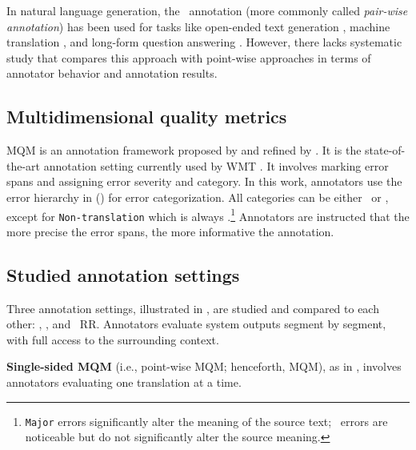 In natural language generation, the \sxs~annotation (more commonly called \textit{pair-wise annotation}) has been used for tasks like open-ended text generation \citep{wang-etal-2023-knn, krishna-etal-2023-longeval}, machine translation \citep{karpinska-iyyer-2023-large}, and long-form question answering \citep{xu-etal-2023-critical}. However, there lacks systematic study that compares this approach with point-wise approaches in terms of annotator behavior and annotation results.

\subsection{Multidimensional quality metrics}\label{sec:MQM}

MQM is an annotation framework proposed by \citet{lommel2014mqm} and refined by \citet{freitag-etal-2021-experts}. It is the state-of-the-art annotation setting currently used by WMT \citep{freitag-etal-2023-results}. It involves marking error spans and assigning error severity and category. In this work, annotators use the error hierarchy in  () for error categorization. All categories can be either \major~or \minor, except for \texttt{Non-translation} which is always \major.\footnote{\texttt{Major} errors significantly alter the meaning of the source text; \minor~errors are noticeable but do not significantly alter the source meaning.} Annotators are instructed that the more precise the error spans, the more informative the annotation.



\subsection{Studied annotation settings}\label{sec:three_studied_settings}

Three annotation settings, illustrated in , are studied and compared to each other: \psxsmqm, \sxsmqm, and \sxs~RR. Annotators evaluate system outputs segment by segment, with full access to the surrounding context.

\textbf{Single-sided MQM} (i.e., point-wise MQM; henceforth, MQM), as in , involves annotators evaluating one translation at a time. 


